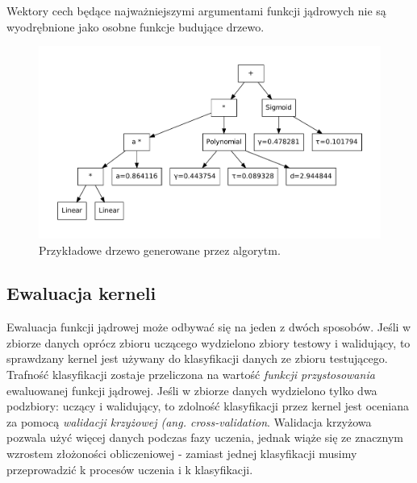 Wektory cech będące najważniejszymi argumentami funkcji jądrowych nie są wyodrębnione jako osobne funkcje budujące drzewo.

\begin{figure}[h]
\centering
\includegraphics[scale=0.6]{figures/tree}
\caption{Przykładowe drzewo generowane przez algorytm.\label{fig:tree}}
\end{figure}


\subsection{Ewaluacja kerneli}
Ewaluacja funkcji jądrowej może odbywać się na jeden z dwóch sposobów. Jeśli w zbiorze danych oprócz zbioru uczącego wydzielono zbiory testowy i walidujący, to sprawdzany kernel jest używany do klasyfikacji danych ze zbioru testującego. Trafność klasyfikacji zostaje przeliczona na wartość \textit{ funkcji przystosowania} ewaluowanej funkcji jądrowej.
Jeśli w zbiorze danych wydzielono tylko dwa podzbiory: uczący i walidujący, to zdolność klasyfikacji przez kernel jest oceniana za pomocą \textit{walidacji krzyżowej (ang. cross-validation}.
Walidacja krzyżowa pozwala użyć więcej danych podczas fazy uczenia, jednak wiąże się ze znacznym wzrostem złożoności obliczeniowej - zamiast jednej klasyfikacji musimy przeprowadzić k procesów uczenia i k klasyfikacji.

